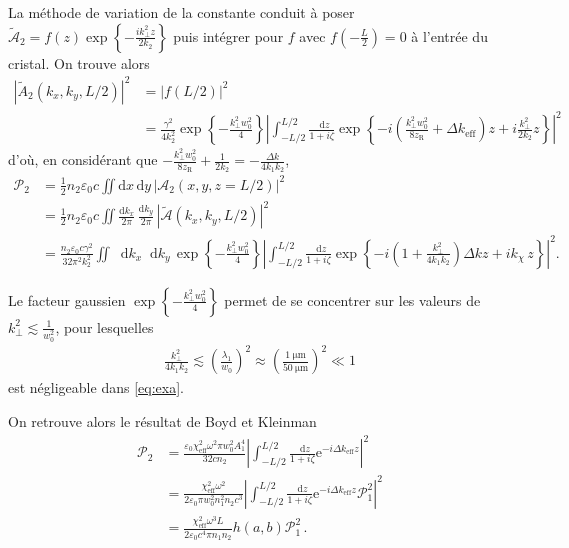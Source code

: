 \documentclass[11pt,a4paper]{article}
\newcommand{\diff}{\mathop{}\!\mathrm{d}}
\newcommand{\zr}{z_\mathsc{R}}
\newcommand{\chie}{\chi_\mathsc{eff}}
\newcommand{\dke}{\Delta k_\mathsc{eff}}
\renewcommand{\P}{\mathscr{P}}
\newcommand{\A}{\mathcal{A}}
\newcommand{\e}[1]{\text{e}^{#1}}
\newcommand{\mathsc}[1]{\mathrm{\scriptscriptstyle {#1}}}
\begin{document}
La méthode de variation de la constante conduit à poser $\tilde{\A}_2 = f(z) \exp\left\{- \frac{i k_\bot^2 z}{2 k_2} \right\}$ puis intégrer pour $f$ avec $f(-\frac L 2) = 0$ à l'entrée du cristal. 
On trouve alors 
\begin{align}
\left| \tilde{A}_2(k_x,k_y,L/2) \right|^2 &= \left| f(L/2) \right|^2  \\
&= \frac{\gamma^2}{4k_2^2} \exp\left\lbrace -\frac{k_\bot^2 w_0^2}{4}\right\rbrace \left|\int_{-L/2}^{L/2} \frac{\diff z}{1+i\zeta} \exp\left\{ -i \left( \frac{k_\bot^2 w_0^2}{8\zr} + \dke \right) z + i \frac{ k_\bot^2 }{2 k_2} z \right\}  \right|^2
\end{align}
d'où, en considérant que $-\frac{k_\bot^2 w_0^2}{8\zr} + \frac{1}{2k_2} = - \frac{\Delta k}{4k_1k_2}$,
\begin{align}
\P_2 &= \frac12 n_2 \varepsilon_0 c \iint \mathrm dx \, \mathrm dy \, |\A_2(x,y,z=L/2)|^2 \\
&= \frac12 n_2 \varepsilon_0 c \iint \frac{\mathrm dk_x}{2\pi} \, \frac{\mathrm d k_y}{2\pi} \, |\tilde{\A}(k_x,k_y,L/2)|^2 \\
&= \frac{n_2\varepsilon_0c \gamma^2}{32\pi^2k_2^2} \iint \diff k_x \diff k_y \, \exp\left\lbrace -\frac{k_\bot^2 w_0^2}{4}\right\rbrace \left|\int_{-L/2}^{L/2} \frac{\diff z}{1+i\zeta} \exp\left\{ -i \left( 1 + \frac{k_\bot^2}{4k_1k_2} \right) \Delta k z + i k_\chi\, z \right\} \right|^2 .
\label{eq:exa}
\end{align}

Le facteur gaussien $\exp \left\{- \frac{k_\bot^2 w_0^2}{4}\right\}$ permet de se concentrer sur les valeurs de $k_\bot^2 \lesssim \frac{1}{w_0^2}$, pour lesquelles 
\begin{align}
\frac{k_\bot^2}{4 k_1 k_2} \lesssim \left(\frac{\lambda_1}{w_0}\right)^2 \approx \left(\frac{\SI{1}{\micro\meter}}{\SI{50}{\micro\meter}} \right)^2 \ll 1
\end{align}
est négligeable dans \eqref{eq:exa}.

On retrouve alors le résultat de Boyd et Kleinman 
\begin{align}
\P_2 &= \frac{\varepsilon_0 \chie^2 \omega^2 \pi w_0^2 A_1^4}{32 c n_2} \left|\int_{-L/2}^{L/2} \frac{\diff z}{1+i\zeta} \e{ -i \dke z } \right|^2 \nonumber \\
&= \frac{\chie^2 \omega^2}{2\varepsilon_0 \pi w_0^2 n_1^2n_2 c^3} \left|\int_{-L/2}^{L/2} \frac{\diff z}{1+i\zeta} \e{ -i \dke z } \P_1^2 \right|^2 \nonumber \\
&= \frac{\chie^2 \omega^3 L}{2 \varepsilon_0 c^4 \pi n_1 n_2} h(a,b) \P_1^2 \,.
\end{align}
\end{document}
